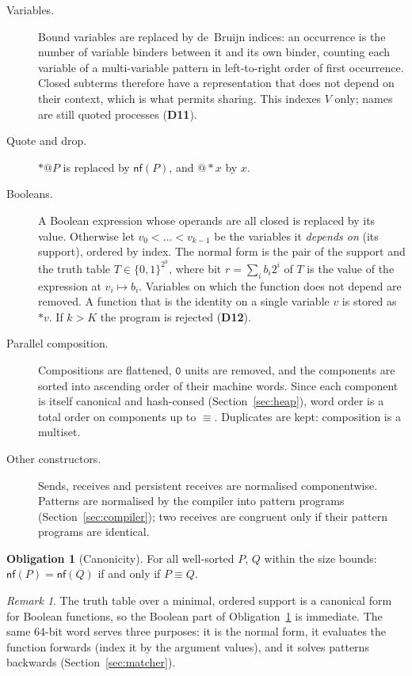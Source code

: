 \documentclass[10.5pt,a4paper]{extarticle}
\makeatletter
\newcommand{\kw}[1]{\texttt{#1}}
\newcommand{\nil}{\kw{0}}
\newcommand{\quo}[1]{@#1}
\newcommand{\drp}[1]{{*}#1}
\newcommand{\scong}{\equiv}
\newcommand{\nf}[1]{\mathsf{nf}(#1)}
\newcommand{\dec}[1]{\textbf{D#1}}
\theoremstyle{definition}
\newtheorem{obligation}{Obligation}
\theoremstyle{remark}
\newtheorem{remark}{Remark}
\makeatother
\begin{document}
\begin{description}
\item[Variables.] Bound variables are replaced by de~Bruijn indices: an
occurrence is the number of variable binders between it and its own binder,
counting each variable of a multi-variable pattern in left-to-right order of
first occurrence. Closed subterms therefore have a representation that does
not depend on their context, which is what permits sharing.
This indexes $V$ only; names are still quoted processes (\dec{11}).

\item[Quote and drop.] $\drp{\quo{P}}$ is replaced by $\nf{P}$, and
$\quo{\drp{x}}$ by $x$.

\item[Booleans.] A Boolean expression whose operands are all closed is
replaced by its value. Otherwise let $v_0 < \dots < v_{k-1}$ be the variables
it \emph{depends on} (its support), ordered by index. The normal form is the
pair of the support and the truth table $T \in \{0,1\}^{2^k}$, where bit
$r = \sum_i b_i 2^i$ of $T$ is the value of the expression at
$v_i \mapsto b_i$. Variables on which the function does not depend are
removed. A function that is the identity on a single variable $v$ is stored
as $\drp{v}$. If $k > K$ the program is rejected (\dec{12}).

\item[Parallel composition.] Compositions are flattened, $\nil$ units are
removed, and the components are sorted into ascending order of their machine
words. Since each component is itself canonical and hash-consed
(Section~\ref{sec:heap}), word order is a total order on components up to
$\scong$. Duplicates are kept: composition is a multiset.

\item[Other constructors.] Sends, receives and persistent receives are
normalised componentwise. Patterns are normalised by the compiler into
pattern programs (Section~\ref{sec:compiler}); two receives are congruent
only if their pattern programs are identical.
\end{description}

\begin{obligation}[Canonicity]\label{ob:canon}
For all well-sorted $P$, $Q$ within the size bounds:
$\nf{P} = \nf{Q}$ if and only if $P \scong Q$.
\end{obligation}

\begin{remark}
The truth table over a minimal, ordered support is a canonical form for
Boolean functions, so the Boolean part of Obligation~\ref{ob:canon} is
immediate. The same 64-bit word serves three purposes: it is the normal form,
it evaluates the function forwards (index it by the argument values), and it
solves patterns backwards (Section~\ref{sec:matcher}).
\end{remark}
\end{document}
